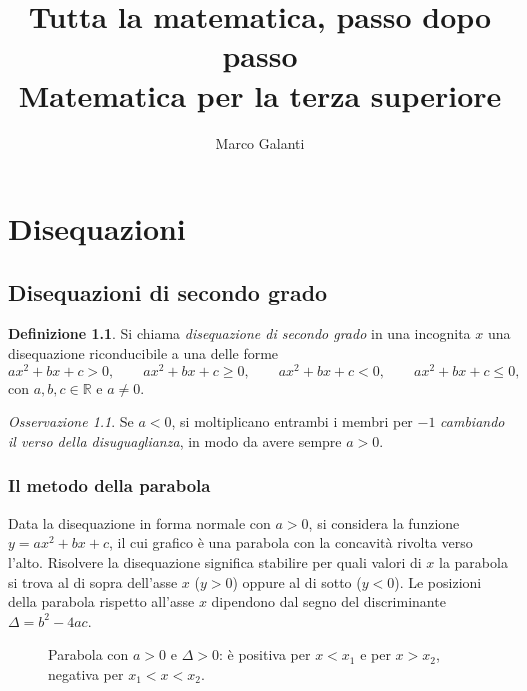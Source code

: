\documentclass[12pt,a4paper,openany]{book}
\title{Tutta la matematica, passo dopo passo\\[0.5em]\large Matematica per la terza superiore}
\author{Marco Galanti}
\date{}
\theoremstyle{definition}
\newtheorem{definizione}{Definizione}[section]
\theoremstyle{plain}
\theoremstyle{remark}
\newtheorem*{osservazione}{Osservazione}
\newcommand{\R}{\mathbb{R}}
\begin{document}
\maketitle
\tableofcontents

\chapter{Disequazioni}

\section{Disequazioni di secondo grado}

\begin{definizione}
Si chiama \emph{disequazione di secondo grado} in una incognita $x$ una disequazione riconducibile a una delle forme
\[
ax^2+bx+c>0,\qquad ax^2+bx+c\ge 0,\qquad ax^2+bx+c<0,\qquad ax^2+bx+c\le 0,
\]
con $a,b,c\in\R$ e $a\neq 0$.
\end{definizione}

\begin{osservazione}
Se $a<0$, si moltiplicano entrambi i membri per $-1$ \emph{cambiando il verso della disuguaglianza}, in modo da avere sempre $a>0$.
\end{osservazione}

\subsection*{Il metodo della parabola}

Data la disequazione in forma normale con $a>0$, si considera la funzione $y=ax^2+bx+c$, il cui grafico è una parabola con la concavità rivolta verso l'alto. Risolvere la disequazione significa stabilire per quali valori di $x$ la parabola si trova al di sopra dell'asse $x$ ($y>0$) oppure al di sotto ($y<0$). Le posizioni della parabola rispetto all'asse $x$ dipendono dal segno del discriminante $\Delta=b^2-4ac$.

\begin{figure}[ht]
\centering
{}
\caption{Parabola con $a>0$ e $\Delta>0$: è positiva per $x<x_1$ e per $x>x_2$, negativa per $x_1<x<x_2$.}
\end{figure}
\end{document}

